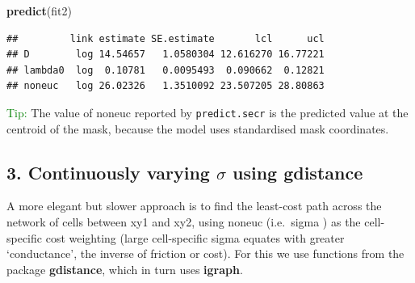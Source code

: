 \documentclass[
]{book}
\newenvironment{Shaded}{\begin{snugshade}}{\end{snugshade}}
\newcommand{\FunctionTok}[1]{\textcolor[rgb]{0.13,0.29,0.53}{\textbf{#1}}}
\newcommand{\NormalTok}[1]{#1}
\begin{document}
\begin{Shaded}
\begin{Highlighting}[]
\FunctionTok{predict}\NormalTok{(fit2)}
\end{Highlighting}
\end{Shaded}

\begin{verbatim}
##         link estimate SE.estimate       lcl      ucl
## D        log 14.54657   1.0580304 12.616270 16.77221
## lambda0  log  0.10781   0.0095493  0.090662  0.12821
## noneuc   log 26.02326   1.3510092 23.507205 28.80863
\end{verbatim}

\textcolor{green}{Tip:} The value of noneuc reported by \texttt{predict.secr} is the predicted value at the centroid of the mask, because the model uses standardised mask coordinates.

\subsection{\texorpdfstring{3. Continuously varying \(\sigma\) using \textbf{gdistance}}{3. Continuously varying \textbackslash sigma using gdistance}}\label{continuously-varying-sigma-using-gdistance}

A more elegant but slower approach is to find the least-cost path across the network of cells between xy1 and xy2, using noneuc (i.e.~sigma ) as the cell-specific cost weighting (large cell-specific sigma equates with greater `conductance', the inverse of friction or cost). For this we use functions from the package \textbf{gdistance}, which in turn uses \textbf{igraph}.
\end{document}
